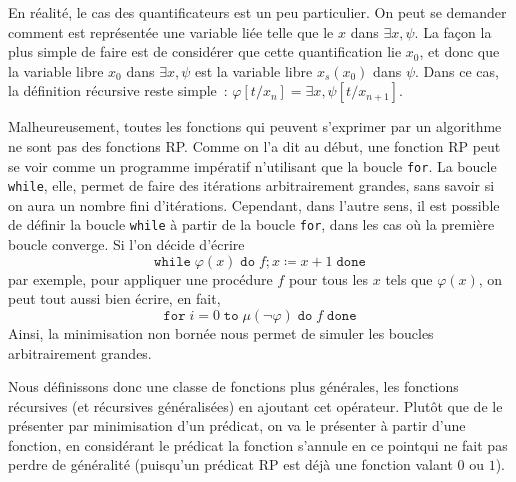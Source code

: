 En réalité, le cas des quantificateurs est un peu particulier. On peut se
demander comment est représentée une variable liée telle que le $x$ dans
$\exists x, \psi$. La façon la plus simple de faire est de considérer que
cette quantification lie $x_0$, et donc que la variable libre $x_0$ dans
$\exists x, \psi$ est la variable libre $x_s(x_0)$ dans $\psi$. Dans ce cas,
la définition récursive reste simple~:
$\varphi[t/x_n] = \exists x, \psi[t/x_{n+1}]$.

Malheureusement, toutes les fonctions qui peuvent s'exprimer par un algorithme
ne sont pas des fonctions RP. Comme on l'a dit au début, une fonction RP peut
se voir comme un programme impératif n'utilisant que la boucle \texttt{for}. La
boucle \texttt{while}, elle, permet de faire des itérations arbitrairement
grandes, sans savoir  si on aura un nombre fini
d'itérations. Cependant, dans l'autre sens, il est possible de définir la boucle
\texttt{while} à partir de la boucle \texttt{for}, dans les cas où la première
boucle converge. Si l'on décide d'écrire
\[\texttt{while}\;\varphi(x) \;\texttt{do}\; f ; x \coloneq x + 1\;
\texttt{done}\]
par exemple, pour appliquer une procédure $f$ pour tous les $x$ tels que
$\varphi(x)$, on peut tout aussi bien écrire, en fait,
\[\texttt{for}\; i = 0 \;\texttt{to}\; \mu(\lnot \varphi)\;\texttt{do}\; f\;
\texttt{done}\]
Ainsi, la minimisation non bornée nous permet de simuler les boucles
arbitrairement grandes.

Nous définissons donc une classe de fonctions plus générales, les fonctions
récursives (et récursives généralisées) en ajoutant cet opérateur. Plutôt que de
le présenter par minimisation d'un prédicat, on va le présenter à partir d'une
fonction, en considérant le prédicat \og la fonction s'annule en ce point\fg qui
ne fait pas perdre de généralité (puisqu'un prédicat RP est déjà une fonction
valant $0$ ou $1$).

